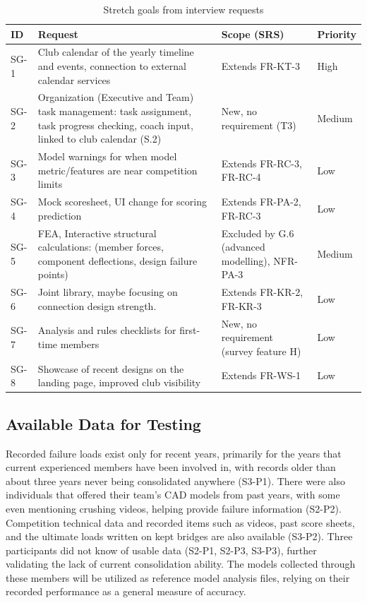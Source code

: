\documentclass{article}
\newcommand{\rid}[1]{\mbox{#1}}
\begin{document}
\begin{table}[H]
\centering
\caption{Stretch goals from interview requests}
\label{tab:stretch}
\small
\begin{tabularx}{\textwidth}{@{}L{0.8cm} Y L{3.3cm} L{1.3cm}@{}}
\toprule
\textbf{ID} & \textbf{Request} & \textbf{Scope (SRS)} & \textbf{Priority} \\
\midrule
SG-1 & Club calendar of the yearly timeline and events, connection to external calendar services & Extends \rid{FR-KT-3} & High \\
SG-2 & Organization (Executive and Team) task management: task assignment, task progress checking, coach input, linked to club calendar (S.2) & New, no requirement (T3) & Medium \\
SG-3 & Model warnings for when model metric/features are near competition limits & Extends \rid{FR-RC-3}, \rid{FR-RC-4} & Low \\
SG-4 & Mock scoresheet, UI change for scoring prediction & Extends \rid{FR-PA-2}, \rid{FR-RC-3} & Low \\
SG-5 & FEA, Interactive structural calculations: (member forces, component deflections, design failure points) & Excluded by G.6 (advanced modelling), \rid{NFR-PA-3} & Medium \\
SG-6 & Joint library, maybe focusing on connection design strength. & Extends \rid{FR-KR-2}, \rid{FR-KR-3} & Low \\
SG-7 & Analysis and rules checklists for first-time members & New, no requirement (survey feature H) & Low \\
SG-8 & Showcase of recent designs on the landing page, improved club visibility & Extends \rid{FR-WS-1} & Low \\
\bottomrule
\end{tabularx}
\end{table}

\subsection{Available Data for Testing}
\label{sec:test-data}

Recorded failure loads exist only for recent years, primarily for the years that 
current experienced members have been involved in, with records older than about
three years never being consolidated anywhere (S3-P1). There were also individuals that
offered their team's CAD models from past years, with some even mentioning crushing videos, 
helping provide failure information (S2-P2). Competition technical data and recorded items 
such as videos, past score sheets, and the ultimate loads written on kept bridges are also 
available (S3-P2). Three participants did not know of usable data (S2-P1, S2-P3, S3-P3), 
further validating the lack of current consolidation ability. The models collected through 
these members will be utilized as reference model analysis files, relying on their recorded 
performance as a general measure of accuracy.
\end{document}
